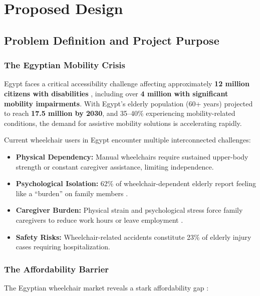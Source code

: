 \documentclass[12pt,a4paper]{report}
\begin{document}
\chapter{Proposed Design}

\section{Problem Definition and Project Purpose}

\subsection{The Egyptian Mobility Crisis}

Egypt faces a critical accessibility challenge affecting approximately \textbf{12 million citizens with disabilities} \cite{idsc_egypt}, including over \textbf{4 million with significant mobility impairments}. With Egypt's elderly population (60+ years) projected to reach \textbf{17.5 million by 2030}, and 35--40\% experiencing mobility-related conditions, the demand for assistive mobility solutions is accelerating rapidly.

Current wheelchair users in Egypt encounter multiple interconnected challenges:

\begin{itemize}[leftmargin=*,itemsep=6pt]
    \item \textbf{Physical Dependency:} Manual wheelchairs require sustained upper-body strength or constant caregiver assistance, limiting independence.
    \item \textbf{Psychological Isolation:} 62\% of wheelchair-dependent elderly report feeling like a ``burden'' on family members \cite{egypt_social_solidarity}.
    \item \textbf{Caregiver Burden:} Physical strain and psychological stress force family caregivers to reduce work hours or leave employment \cite{egypt_social_solidarity}.
    \item \textbf{Safety Risks:} Wheelchair-related accidents constitute 23\% of elderly injury cases requiring hospitalization.
\end{itemize}

\subsection{The Affordability Barrier}

The Egyptian wheelchair market reveals a stark affordability gap \cite{grandview_market}:
\end{document}
